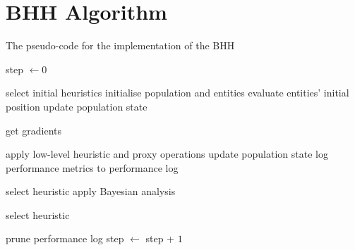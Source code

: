 \section{BHH Algorithm}
\label{app:appendix_bhh_algorithm}

\begin{algorithm}[H]
	\caption{The pseudo-code for the implementation of the \acf{BHH}}
	\label{algo:bhh}
	\begin{algorithmic}
		\State step $\gets 0$

		\State select initial heuristics
		\State initialise population and entities
		\State evaluate entities' initial position
		\State update population state

		\State get gradients
		\EndIf

		\State apply low-level heuristic and proxy operations
		\State update population state
		\State log performance metrics to performance log

		\State select heuristic
		\Else
		\State apply Bayesian analysis
		\EndIf

		\State select heuristic
		\EndIf

		\State prune performance log
		\EndIf
		\EndIf
		\EndFor
		\State step $\gets$ step + $1$
		\EndWhile
	\end{algorithmic}
\end{algorithm}
